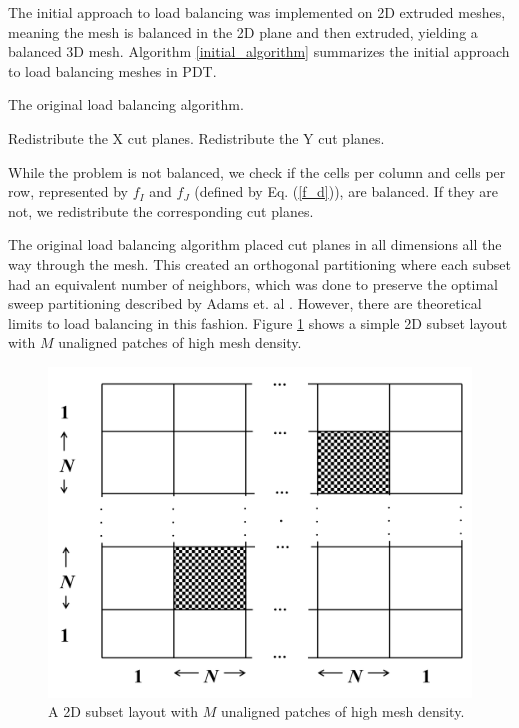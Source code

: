 The initial approach to load balancing was implemented on 2D extruded meshes, meaning the mesh is balanced in the 2D plane and then extruded, yielding a balanced 3D mesh. Algorithm \ref{initial_algorithm} summarizes the initial approach to load balancing meshes in PDT.

\begin{algorithm}[H]
\caption{The original load balancing algorithm.}
\label{initial_algorithm}
\begin{algorithmic}

    \STATE Redistribute the X cut planes.
  \ENDIF
  	\STATE Redistribute the Y cut planes.
  \ENDIF
\ENDWHILE
\end{algorithmic}
\end{algorithm}
While the problem is not balanced, we check if the cells per column and cells per row, represented by $f_I$ and $f_J$ (defined by Eq. (\ref{f_d})), are balanced. If they are not, we redistribute the corresponding cut planes.

The original load balancing algorithm placed cut planes in all dimensions all the way through the mesh. This created an orthogonal partitioning where each subset had an equivalent number of neighbors, which was done to preserve the optimal sweep partitioning described by Adams et. al \cite{mpadams2015}. However, there are theoretical limits to load balancing in this fashion. Figure \ref{2dgeneral} shows a simple 2D subset layout with $M$ unaligned patches of high mesh density.

\begin{figure}[H]
\centering
\includegraphics[scale=0.4]{Figures/2dgeneral.png}
\caption{A 2D subset layout with $M$ unaligned patches of high mesh density.}
\label{2dgeneral}
\end{figure}

